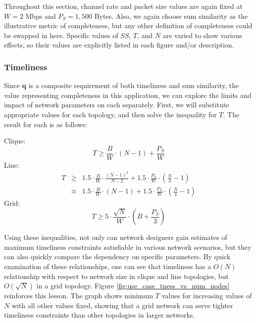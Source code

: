 Throughout this section, channel rate and packet size values are again fixed at $W = 2$ Mbps and $P_S = 1,500$ Bytes.  Also, we again choose sum similarity as the illustrative metric of completeness, but any other definition of completeness could be swapped in here.  Specific values of $SS$, $T$, and $N$ are varied to show various effects, so their values are explicitly listed in each figure and/or description.

\subsubsection{Timeliness}
Since $\mathbf{q}$ is a composite requirement of both timeliness and sum similarity, the value representing completeness in this application, we can explore the limits and impact of network parameters on each separately.  First, we will substitute appropriate values for each topology, and then solve the inequality for $T$. The result for each is as follows:

\vspace{4mm}
\noindent
Clique:
\begin{equation}
	T \geq \frac{B}{W} \cdot (N -1) + \frac{P_S}{W}
\label{eq:tness_clique}
\end{equation}
Line:
\begin{eqnarray}
\label{eq:tness_line_1}
	T &\geq& 1.5 \cdot \frac{B}{W} \cdot \frac{(N-1)^2}{N-2} + 1.5 \cdot \frac{P_S}{W} \cdot (\frac{N}{4} - 1) \\
	&\approx& 1.5 \cdot \frac{B}{W} \cdot (N-1) + 1.5 \cdot \frac{P_S}{W} \cdot (\frac{N}{4} - 1)
\label{eq:tness_line}
\end{eqnarray}
Grid:
\begin{equation}
	T \geq 5 \cdot \frac{\sqrt{N}}{W} \cdot (B + \frac{P_S}{3})
\label{eq:tness_grid}
\end{equation}

Using these inequalities, not only can network designers gain estimates of maximum timeliness constraints satisfiable in various network scenarios, but they can also quickly compare the dependency on specific parameters.  By quick examination of these relationships, one can see that timeliness has a $O(N)$ relationship with respect to network size in clique and line topologies, but $O(\sqrt{N})$ in a grid topology.  Figure \ref{fig:use_case_tness_vs_num_nodes} reinforces this lesson.  The graph shows minimum $T$ values for increasing values of $N$ with all other values fixed, showing that a grid network can serve tighter timeliness constraints than other topologies in larger networks.

